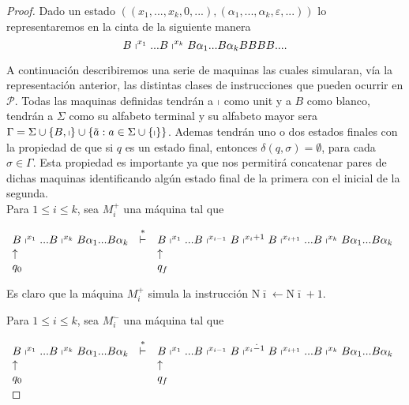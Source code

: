   \begin{proof}
    Dado un estado $((x_{1},...,x_{k},0,...),(\alpha _{1},...,\alpha _{k},\varepsilon ,...))$ lo representaremos en la
    cinta de la siguiente manera
    \[
      B\shortmid ^{x_{1}}...B\shortmid ^{x_{k}}B\alpha _{1}...B\alpha _{k}BBBB....
    \]

    A continuación describiremos una serie de maquinas las cuales simularan, vía la representación anterior, las
    distintas clases de instrucciones que pueden ocurrir en $\mathcal{P}$. Todas las maquinas definidas tendrán a
    $\shortmid $ como unit y a $B$ como blanco, tendrán a $\Sigma $ como su alfabeto terminal y su alfabeto mayor sera
    $\Gamma =\Sigma \cup \{B,\shortmid \}\cup \{\tilde{a }:a\in \Sigma \cup \{\shortmid \}\}$. Ademas tendrán uno o dos
    estados finales con la propiedad de que si $q$ es un estado final, entonces $\delta (q,\sigma )=\emptyset $, para cada $\sigma \in \Gamma $. Esta propiedad es importante ya que nos permitirá concatenar pares de dichas maquinas identificando algún estado final de la primera con el inicial de la segunda. \\

		\noindent Para $1\leq i\leq k$, sea $M_{i}^{+}$ una máquina tal que

		\bigskip

    $\displaystyle \begin{array}{lcl} B\shortmid ^{x_{1}}...B\shortmid ^{x_{k}}B\alpha _{1}...B\alpha _{k} &
    \overset{\ast }{\vdash } & B\shortmid ^{x_{1}}...B\shortmid ^{x_{i-1}}B\shortmid ^{x_{i}+1}B\shortmid
    ^{x_{i+1}}...B\shortmid ^{x_{k}}B\alpha _{1}...B\alpha _{k} \\ \uparrow & & \uparrow \\ q_{0} & & q_{f} \end{array} $

    Es claro que la máquina $M_{i}^{+}$ simula la instrucción $\mathrm{N}\bar{ \imath}\leftarrow \mathrm{N}\bar{\imath}+1$.

    \noindent Para $1\leq i\leq k$, sea $M_{i}^{\dot{-}}$ una máquina tal que

		\bigskip

    $\displaystyle \begin{array}{lcl} B\shortmid ^{x_{1}}...B\shortmid ^{x_{k}}B\alpha _{1}...B\alpha _{k} &
    \overset{\ast }{\vdash } & B\shortmid ^{x_{1}}...B\shortmid ^{x_{i-1}}B\shortmid ^{x_{i}\dot{-}1}B\shortmid
    ^{x_{i+1}}...B\shortmid ^{x_{k}}B\alpha _{1}...B\alpha _{k} \\ \uparrow & & \uparrow \\ q_{0} & & q_{f} \end{array} $


\end{proof}
